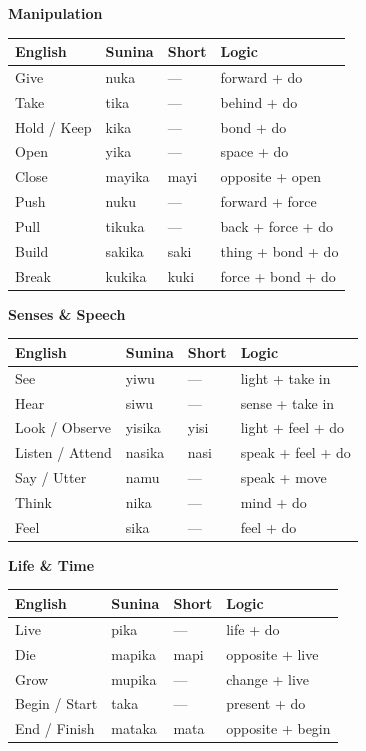 \documentclass[12pt, a4paper]{article}
\begin{document}
\medskip
\noindent\textbf{Manipulation}
\begin{tabular}{@{}llll@{}}
\toprule
\textbf{English} & \textbf{Sunina} & \textbf{Short} & \textbf{Logic} \\ \midrule
Give & nuka & --- & forward + do \\
Take & tika & --- & behind + do \\
Hold / Keep & kika & --- & bond + do \\
Open & yika & --- & space + do \\
Close & mayika & mayi & opposite + open \\
Push & nuku & --- & forward + force \\
Pull & tikuka & --- & back + force + do \\
Build & sakika & saki & thing + bond + do \\
Break & kukika & kuki & force + bond + do \\
\bottomrule
\end{tabular}

\medskip
\noindent\textbf{Senses \& Speech}
\begin{tabular}{@{}llll@{}}
\toprule
\textbf{English} & \textbf{Sunina} & \textbf{Short} & \textbf{Logic} \\ \midrule
See & yiwu & --- & light + take in \\
Hear & siwu & --- & sense + take in \\
Look / Observe & yisika & yisi & light + feel + do \\
Listen / Attend & nasika & nasi & speak + feel + do \\
Say / Utter & namu & --- & speak + move \\
Think & nika & --- & mind + do \\
Feel & sika & --- & feel + do \\
\bottomrule
\end{tabular}

\medskip
\noindent\textbf{Life \& Time}
\begin{tabular}{@{}llll@{}}
\toprule
\textbf{English} & \textbf{Sunina} & \textbf{Short} & \textbf{Logic} \\ \midrule
Live & pika & --- & life + do \\
Die & mapika & mapi & opposite + live \\
Grow & mupika & --- & change + live \\
Begin / Start & taka & --- & present + do \\
End / Finish & mataka & mata & opposite + begin \\
\bottomrule
\end{tabular}
\end{document}
